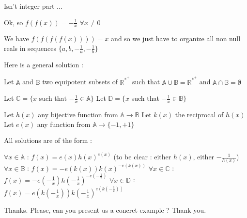 \begin{solution}
	\begin{tcolorbox}Isn't integer part ...\end{tcolorbox}
Ok, so $ f(f(x))=-\frac{1}{x}$ $ \forall x\neq 0$

We have $ f(f(f(f(x))))=x$ and so we just have to organize all non null reals in sequences $ \{a,b,-\frac{1}{a},-\frac{1}{b}\}$

Here is a general solution :

Let $ \mathbb{A}$ and $ \mathbb{B}$ two equipotent subsets of $ \mathbb{R^*^+}$ such that $ \mathbb{A}\cup\mathbb{B}=\mathbb{R^*^+}$ and $ \mathbb{A}\cap\mathbb{B}=\emptyset$

Let $ \mathbb{C}=\{x$ such that $ -\frac{1}{x}\in\mathbb{A}\}$
Let $ \mathbb{D}=\{x$ such that $ -\frac{1}{x}\in\mathbb{B}\}$

Let $ h(x)$ any bijective function from $ \mathbb{A}\longrightarrow\mathbb{B}$
Let $ k(x)$ the reciprocal of $ h(x)$
Let $ e(x)$ any function from $ \mathbb{A}\longrightarrow\{-1,+1\}$

All solutions are of the form :

$ \forall x\in\mathbb{A}$ : $ f(x)=e(x)h(x)^{e(x)}$ (to be clear : either $ h(x)$, either $ -\frac{1}{h(x)}$)
$ \forall x\in\mathbb{B}$ : $ f(x)=-e(k(x))k(x)^{-e(k(x))}$
$ \forall x\in\mathbb{C}$ : $ f(x)=-e(-\frac{1}{x})h(-\frac{1}{x})^{-e(-\frac{1}{x})}$
$ \forall x\in\mathbb{D}$ : $ f(x)=e(k(-\frac{1}{x}))k(-\frac{1}{x})^{e(k(-\frac{1}{x}))}$
\end{solution}



\begin{solution}
	Thanks. Please, can you present us a concret example ? Thank you.
\end{solution}



